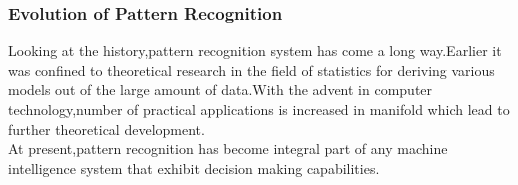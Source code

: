 \documentclass{beamer}
\begin{document}
\begin{frame}
\transboxout

\frametitle{Evolution of Pattern Recognition}

\hspace{2cm}Looking at the history,pattern recognition system has come a long way.Earlier it was confined to theoretical research in the field of statistics for deriving various models out of the large amount of data.With the advent in computer technology,number of practical applications is increased in manifold which lead to further theoretical development.\\

\hspace{2cm}At present,pattern recognition has become integral part of any machine intelligence system that exhibit decision making capabilities.\\

\begin{center}


\end{center}
\end{frame}
\end{document}
